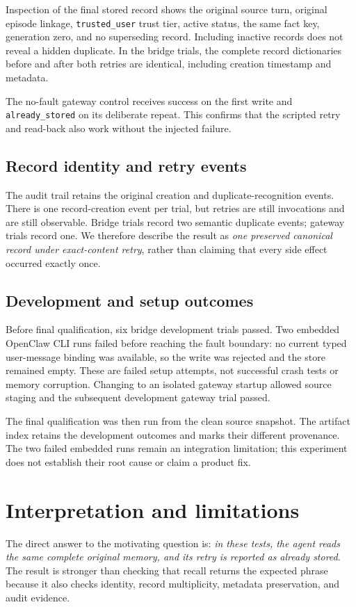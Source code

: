 \documentclass[10pt,twocolumn]{article}
\begin{document}
Inspection of the final stored record shows the original source turn, original
episode linkage, \texttt{trusted\_user} trust tier, active status, the same
fact key, generation zero, and no superseding record. Including inactive
records does not reveal a hidden duplicate. In the bridge trials, the complete
record dictionaries before and after both retries are identical, including
creation timestamp and metadata.

The no-fault gateway control receives success on the first write and
\texttt{already\_stored} on its deliberate repeat. This confirms that the
scripted retry and read-back also work without the injected failure.

\subsection{Record identity and retry events}
The audit trail retains the original creation and duplicate-recognition
events. There is one record-creation event per trial, but retries are still
invocations and are still observable. Bridge trials record two semantic
duplicate events; gateway trials record one. We therefore describe the result
as \emph{one preserved canonical record under exact-content retry}, rather
than claiming that every side effect occurred exactly once.

\subsection{Development and setup outcomes}
Before final qualification, six bridge development trials passed. Two embedded
OpenClaw CLI runs failed before reaching the fault boundary: no current typed
user-message binding was available, so the write was rejected and the store
remained empty. These are failed setup attempts, not successful crash tests
or memory corruption. Changing to an isolated gateway startup allowed source
staging and the subsequent development gateway trial passed.

The final qualification was then run from the clean source snapshot. The
artifact index retains the development outcomes and marks their different
provenance. The two failed embedded runs remain an integration limitation;
this experiment does not establish their root cause or claim a product fix.

\balance
\section{Interpretation and limitations}
The direct answer to the motivating question is: \emph{in these tests, the
agent reads the same complete original memory, and its retry is reported as
already stored}. The result is stronger than checking that recall returns the
expected phrase because it also checks identity, record multiplicity,
metadata preservation, and audit evidence.
\end{document}

